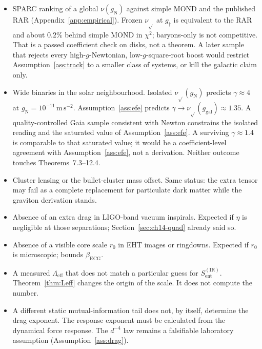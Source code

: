 \begin{itemize}
  \item SPARC ranking of a global \(\nu(g_{\mathrm{N}})\) against
        simple MOND and the published RAR
        (Appendix~\ref{app:empirical}). Frozen
        \(\nu_{\sqrt{}} \) at \(g_\dagger\) is equivalent to the
        RAR and about \(0.2\%\) behind simple MOND in \(\chi^2\);
        baryons-only is not competitive. That is a passed
        coefficient check on disks, not a theorem. A later
        sample that rejects every high-\(g\)-Newtonian,
        low-\(g\)-square-root boost would restrict
        Assumption~\ref{ass:track} to a smaller class of
        systems, or kill the galactic claim only.
  \item Wide binaries in the solar neighbourhood.
        Isolated \(\nu_{\sqrt{}}(g_{\mathrm{N}})\) predicts
        \(\gamma\approx 4\) at \(g_{\mathrm{N}}=10^{-11}\,\mathrm{m\,s^{-2}}\).
        Assumption~\ref{ass:efe} predicts
        \(\gamma\to\nu_{\sqrt{}}(g_{\mathrm{gal}})\approx 1.35\).
        A quality-controlled Gaia sample consistent with Newton
        constrains the isolated reading and the saturated value
        of Assumption~\ref{ass:efe}.
        A surviving \(\gamma\approx 1.4\) is comparable to that
        saturated value; it would be a coefficient-level agreement
        with Assumption~\ref{ass:efe}, not a derivation.
        Neither outcome touches Theorems~7.3--12.4.
  \item Cluster lensing or the bullet-cluster mass offset.
        Same status: the extra tensor may fail as a complete
        replacement for particulate dark matter while the graviton
        derivation stands.
  \item Absence of an extra drag in LIGO-band vacuum inspirals.
        Expected if \(\eta\) is negligible at those separations;
        Section~\ref{sec:ch14-quad} already said so.
  \item Absence of a visible core scale \(r_0\) in EHT images or
        ringdowns. Expected if \(r_0\) is microscopic; bounds
        \(\beta_{\mathrm{ECG}}\).
  \item A measured \(\Lambda_{\mathrm{eff}}\) that does not match
        a particular guess for \(S_{\mathrm{ent}}^{\mathrm{(IR)}}\).
        Theorem~\ref{thm:Leff} changes the origin of the scale. It
        does not compute the number.
  \item A different static mutual-information tail does not, by
        itself, determine the drag exponent. The response exponent
        must be calculated from the dynamical force response. The
        \(d^{-4}\) law remains a falsifiable laboratory assumption
        (Assumption~\ref{ass:drag}).
\end{itemize}

